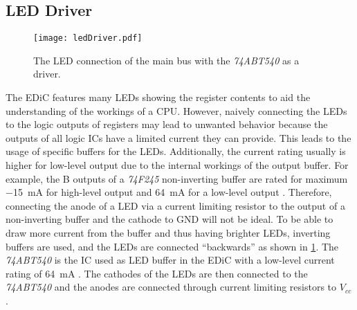 \subsection{LED Driver}\label{sec:ledBuffer}

\begin{figure}[t]
  \centering
  \texttt{[image: ledDriver.pdf]}
  \caption{The \gls{LED} connection of the main bus with the \emph{74ABT540} as a driver.}
  \label{fig:ledDriver}
\end{figure}
The \gls{EDiC} features many \glspl{LED} showing the register contents to aid the understanding of the workings of a \gls{CPU}.
However, naively connecting the \glspl{LED} to the logic outputs of registers may lead to unwanted behavior because the outputs of all logic \glspl{IC} have a limited current they can provide.
This leads to the usage of specific buffers for the \glspl{LED}.
Additionally, the current rating usually is higher for low-level output due to the internal workings of the output buffer. %
For example, the B outputs of a \emph{74F245} non-inverting buffer are rated for maximum \qty{-15}{\milli\ampere} for high-level output and \qty{64}{\milli\ampere} for a low-level output \cite{74f245}.
Therefore, connecting the anode of a \gls{LED} via a current limiting resistor to the output of a non-inverting buffer and the cathode to GND will not be ideal.
To be able to draw more current from the buffer and thus having brighter \glspl{LED}, inverting buffers are used, and the \glspl{LED} are connected ``backwards'' as shown in \cref{fig:ledDriver}.
The \emph{74ABT540} is the \gls{IC} used as \gls{LED} buffer in the \gls{EDiC} with a low-level current rating of \qty{64}{\milli\ampere} \cite{74abt540}.
The cathodes of the \glspl{LED} are then connected to the \emph{74ABT540} and the anodes are connected through current limiting resistors to $V_{cc}$.


